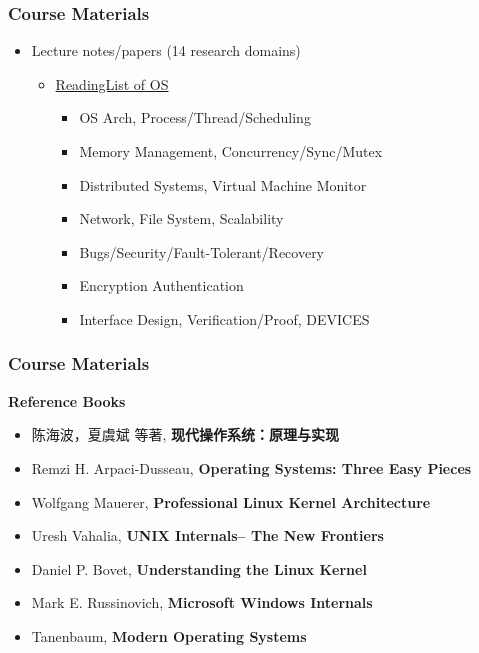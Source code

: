 \begin{frame}[plain]	
	\frametitle{Course Materials}
	
	\begin{itemize}\Large 
		\item Lecture notes/papers (14 research domains)
		
		\begin{itemize}\large 
			\item  \href{https://github.com/chyyuu/aos\_course/blob/master/readinglist.md}{ReadingList of OS}
			\begin{itemize}\large 
				\item OS Arch,  Process/Thread/Scheduling
				\item Memory Management, Concurrency/Sync/Mutex
				\item Distributed Systems, Virtual Machine Monitor
				\item Network, File System, Scalability
				\item Bugs/Security/Fault-Tolerant/Recovery
				\item Encryption Authentication
				\item Interface Design, Verification/Proof, DEVICES
			\end{itemize}
		\end{itemize}
	\end{itemize}
	
\end{frame}

\begin{frame}[plain]	
	\frametitle{Course Materials}
	\Large 
	\textbf{Reference Books}
	\begin{itemize}\large 
        \item 陈海波，夏虞斌 等著, \textbf{现代操作系统：原理与实现}
        \item Remzi H. Arpaci-Dusseau, \textbf{Operating Systems: Three Easy Pieces}
		\item Wolfgang Mauerer, \textbf{Professional Linux Kernel Architecture}
		\item Uresh Vahalia, \textbf{UNIX Internals-- The New Frontiers}
		\item Daniel P. Bovet, \textbf{Understanding the Linux Kernel}
		\item Mark E. Russinovich,\textbf{ Microsoft Windows Internals}
		\item Tanenbaum, \textbf{Modern Operating Systems}

	\end{itemize}
	
\end{frame}



